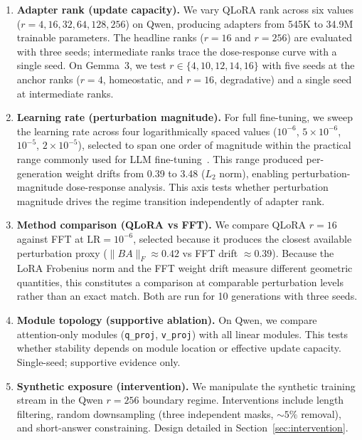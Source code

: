 \documentclass[a4paper,fleqn]{cas-dc}
\begin{document}
\begin{enumerate}
\item \textbf{Adapter rank (update capacity).} We vary QLoRA rank across six
values ($r=4,16,32,64,128,256$) on Qwen, producing adapters from 545K to 34.9M
trainable parameters. The headline ranks ($r=16$ and $r=256$) are evaluated with
three seeds; intermediate ranks trace the dose-response curve with a single
seed. On Gemma~3, we test $r \in \{4,10,12,14,16\}$ with five seeds at the
anchor ranks ($r=4$, homeostatic, and $r=16$, degradative) and a single seed at intermediate ranks.

\item \textbf{Learning rate (perturbation magnitude).} For full fine-tuning, we
sweep the learning rate across four logarithmically spaced values ($10^{-6}$,
$5{\times}10^{-6}$, $10^{-5}$, $2{\times}10^{-5}$), selected to span one
order of magnitude within the practical range commonly used for LLM
fine-tuning~\citep{hu2022,dettmers2023}. This range produced per-generation
weight drifts from 0.39 to 3.48 ($L_2$ norm), enabling perturbation-magnitude
dose-response analysis. This axis tests whether
perturbation magnitude drives the regime transition independently of adapter
rank.

\item \textbf{Method comparison (QLoRA vs FFT).} We compare QLoRA $r=16$
against FFT at $\mathrm{LR}=10^{-6}$, selected because it produces the closest
available perturbation proxy ($\|BA\|_F \approx 0.42$ vs FFT drift $\approx
0.39$). Because the LoRA Frobenius norm and the FFT weight drift measure
different geometric quantities, this constitutes a comparison at comparable
perturbation levels rather than an exact match. Both
are run for 10 generations with three seeds.

\item \textbf{Module topology (supportive ablation).} On Qwen, we compare
attention-only modules (\texttt{q\_proj}, \texttt{v\_proj}) with all linear
modules. This tests whether stability depends on module location or effective
update capacity. Single-seed; supportive evidence only.

\item \textbf{Synthetic exposure (intervention).} We manipulate the synthetic
training stream in the Qwen $r=256$ boundary regime. Interventions include
length filtering, random downsampling (three independent masks, ${\sim}5\%$
removal), and short-answer constraining. Design detailed in
Section~\ref{sec:intervention}.
\end{enumerate}
\end{document}
